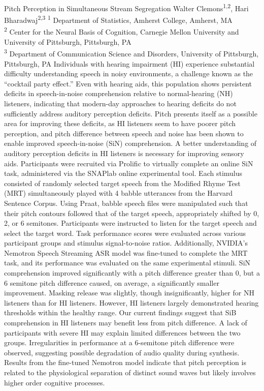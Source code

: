 \makeabstract
    {
    Pitch Perception in Simultaneous Stream Segregation
    }
    {
    Walter Clemons\textsuperscript{1,2}, Hari Bharadwaj\textsuperscript{2,3}
    }
    {
    \textsuperscript{1} Department of Statistics, Amherst College, Amherst, MA\\
\textsuperscript{2} Center for the Neural Basis of Cognition, Carnegie Mellon University and University of Pittsburgh, Pittsburgh, PA\\
\textsuperscript{3} Department of Communication Science and Disorders, University of Pittsburgh, Pittsburgh, PA
    }
    {
    Individuals with hearing impairment (HI) experience substantial difficulty understanding speech in noisy environments, a challenge known as the ``cocktail party effect.'' Even with hearing aids, this population shows persistent deficits in speech-in-noise comprehension relative to normal-hearing (NH) listeners, indicating that modern-day approaches to hearing deficits do not sufficiently address auditory perception deficits. Pitch presents itself as a possible area for improving these deficits, as HI listeners seem to have poorer pitch perception, and pitch difference between speech and noise has been shown to enable improved speech-in-noise (SiN) comprehension. A better understanding of auditory perception deficits in HI listeners is necessary for improving sensory aids.
    }
    {
    Participants were recruited via Prolific to virtually complete an online SiN task, administered via the SNAPlab online experimental tool. Each stimulus consisted of randomly selected target speech from the Modified Rhyme Test (MRT) simultaneously played with 4 babble utterances from the Harvard Sentence Corpus. Using Praat, babble speech files were manipulated such that their pitch contours followed that of the target speech, appropriately shifted by 0, 2, or 6 semitones. Participants were instructed to listen for the target speech and select the target word. Task performance scores were evaluated across various participant groups and stimulus signal-to-noise ratios. Additionally, NVIDIA{\textquoteright}s Nemotron Speech Streaming ASR model was fine-tuned to complete the MRT task, and its performance was evaluated on the same experimental stimuli.
    }
    {
    SiN comprehension improved significantly with a pitch difference greater than 0, but a 6 semitone pitch difference caused, on average, a significantly smaller improvement. Masking release was slightly, though insignificantly, higher for NH listeners than for HI listeners. However, HI listeners largely demonstrated hearing thresholds within the healthy range.
    }
    {
    Our current findings suggest that SiB comprehension in HI listeners may benefit less from pitch difference. A lack of participants with severe HI may explain limited differences between the two groups. Irregularities in performance at a 6-semitone pitch difference were observed, suggesting possible degradation of audio quality during synthesis. Results from the fine-tuned Nemotron model indicate that pitch perception is related to the physiological separation of distinct sound waves but likely involves higher order cognitive processes.
    }

    \newpage
    
